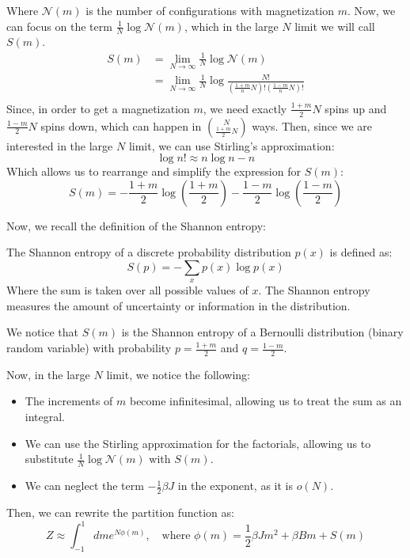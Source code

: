 Where $\mathcal{N}(m)$ is the number of configurations with magnetization $m$. Now, we can focus on the term $\frac{1}{N} \log\mathcal{N}(m)$, which in the large $N$ limit we will call $S(m)$.
\begin{equation}
    \begin{aligned}
        S(m) &= \lim_{N \rightarrow \infty}\frac{1}{N}\log\mathcal{N}(m)\\
        &= \lim_{N \rightarrow \infty}\frac{1}{N}\log \frac{N!}{\left(\frac{1+m}{n}N\right)!\left(\frac{1-m}{n}N\right)!}\\
    \end{aligned}
\end{equation}
Since, in order to get a magnetization $m$, we need exactly $\frac{1+m}{2}N$ spins up and $\frac{1-m}{2}N$ spins down, which can happen in $\binom{N}{\frac{1+m}{2}N}$ ways. Then, since we are interested in the large $N$ limit, we can use Stirling's approximation:
\begin{equation}
    \log n! \approx n\log n - n
\end{equation}
Which allows us to rearrange and simplify the expression for $S(m)$:
\begin{equation}
    S(m) = -\frac{1+m}{2}\log\left(\frac{1+m}{2}\right) - \frac{1-m}{2}\log\left(\frac{1-m}{2}\right)
\end{equation}

Now, we recall the definition of the Shannon entropy:
\begin{definition}
    The Shannon entropy of a discrete probability distribution $p(x)$ is defined as:
    \begin{equation}
        S(p) = -\sum_x p(x)\log p(x)
    \end{equation}
    Where the sum is taken over all possible values of $x$.
    The Shannon entropy measures the amount of uncertainty or information in the distribution.
\end{definition}

We notice that $S(m)$ is the Shannon entropy of a Bernoulli distribution (binary random variable) with probability $p = \frac{1+m}{2}$ and $q = \frac{1-m}{2}$.

Now, in the large $N$ limit, we notice the following:
\begin{itemize}
    \item The increments of $m$ become infinitesimal, allowing us to treat the sum as an integral.
    \item We can use the Stirling approximation for the factorials, allowing us to substitute $\frac{1}{N}\log\mathcal{N}(m)$ with $S(m)$.
    \item We can neglect the term $-\frac{1}{2}\beta J$ in the exponent, as it is $o(N)$.
\end{itemize}
Then, we can rewrite the partition function as:
\begin{equation}
    \label{eq:curie_weiss_phi}
    Z \approx \int_{-1}^{1} dm e^{N\phi(m)}, \quad \text{where }
    \phi(m) = \frac{1}{2}\beta J m^2 + \beta B m + S(m)
\end{equation}

